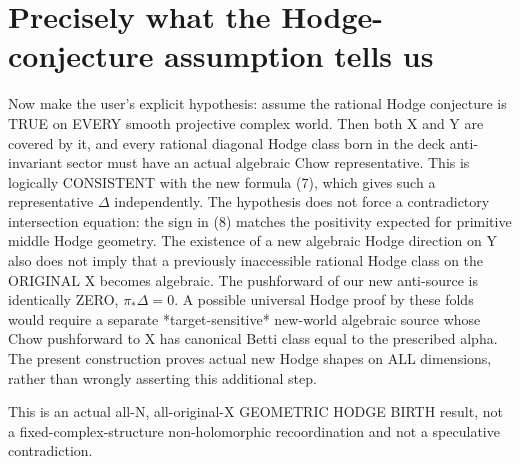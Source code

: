 \documentclass[11pt]{article}
\begin{document}
\section{Precisely what the Hodge-conjecture assumption tells us}
Now make the user's explicit hypothesis:
assume the rational Hodge conjecture is
TRUE on EVERY smooth projective complex world.
Then both X and Y are covered by it, and
every rational diagonal Hodge class born
in the deck anti-invariant sector must have
an actual algebraic Chow representative.
This is logically CONSISTENT with the
new formula (7), which gives such a
representative \(\Delta\) independently.
The hypothesis does not force a
contradictory intersection equation:
the sign in (8) matches the positivity
expected for primitive middle Hodge geometry.
The existence of a new algebraic Hodge
direction on Y also does not imply that
a previously inaccessible rational Hodge
class on the ORIGINAL X becomes algebraic.
The pushforward of our new anti-source
is identically ZERO, \(\pi_*\Delta=0\).
A possible universal Hodge proof by these
folds would require a separate
*target-sensitive* new-world algebraic source
whose Chow pushforward to X has canonical
Betti class equal to the prescribed alpha.
The present construction proves actual
new Hodge shapes on ALL dimensions, rather
than wrongly asserting this additional step.

This is an actual all-N, all-original-X
GEOMETRIC HODGE BIRTH result, not a
fixed-complex-structure non-holomorphic
recoordination and not a speculative
contradiction.
\end{document}
